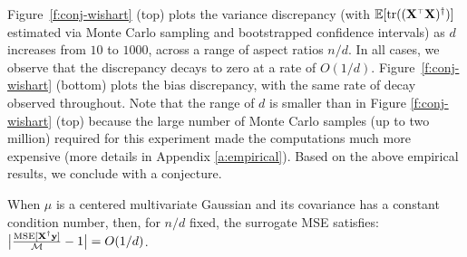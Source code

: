 Figure~\ref{f:conj-wishart} (top) plots the variance discrepancy (with
$\E[\tr((\X^\top\X)^\dagger)]$ estimated via Monte Carlo
sampling and bootstrapped confidence intervals) as $d$ increases from $10$ to
$1000$, across a range of aspect ratios $n/d$. In all cases, we observe that
the discrepancy decays to zero at a rate of $O(1/d)$.
Figure~\ref{f:conj-wishart} (bottom) plots the bias discrepancy, with the same
rate of decay observed throughout.  Note that the range of $d$ is smaller than
in Figure \ref{f:conj-wishart} (top) because the large number of Monte Carlo
samples (up to two million) required for this experiment made the computations
much more expensive (more details in Appendix \ref{a:empirical}). Based on the
above empirical results, we conclude with a conjecture.
\begin{conjecture}
  \label{c:1-over-d-rate}
  When $\mu$ is a centered multivariate Gaussian and its covariance
  has a constant condition
  number, then, for $n/d$ fixed, the surrogate MSE satisfies:
  $\big|\frac{\textnormal{MSE}[\mathbf X^\dagger\mathbf y]}{\mathcal M}-1\big|= O(1/d)$.
\end{conjecture}




